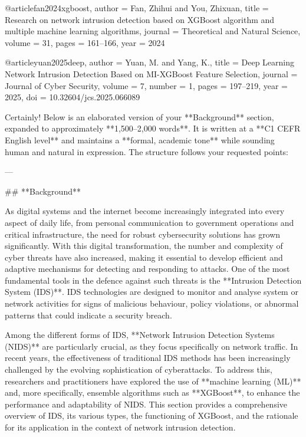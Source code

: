 @article{fan2024xgboost,
  author = {Fan, Zhihui and You, Zhixuan},
  title = {Research on network intrusion detection based on XGBoost algorithm and multiple machine learning algorithms},
  journal = {Theoretical and Natural Science},
  volume = {31},
  pages = {161–166},
  year = {2024}
}

@article{yuan2025deep,
  author = {Yuan, M. and Yang, K.},
  title = {Deep Learning Network Intrusion Detection Based on MI-XGBoost Feature Selection},
  journal = {Journal of Cyber Security},
  volume = {7},
  number = {1},
  pages = {197–219},
  year = {2025},
  doi = {10.32604/jcs.2025.066089}
}






Certainly! Below is an elaborated version of your **Background** section, expanded to approximately **1,500–2,000 words**. It is written at a **C1 CEFR English level** and maintains a **formal, academic tone** while sounding human and natural in expression. The structure follows your requested points:

---

## **Background**

As digital systems and the internet become increasingly integrated into every aspect of daily life, from personal communication to government operations and critical infrastructure, the need for robust cybersecurity solutions has grown significantly. With this digital transformation, the number and complexity of cyber threats have also increased, making it essential to develop efficient and adaptive mechanisms for detecting and responding to attacks. One of the most fundamental tools in the defence against such threats is the **Intrusion Detection System (IDS)**. IDS technologies are designed to monitor and analyse system or network activities for signs of malicious behaviour, policy violations, or abnormal patterns that could indicate a security breach.

Among the different forms of IDS, **Network Intrusion Detection Systems (NIDS)** are particularly crucial, as they focus specifically on network traffic. In recent years, the effectiveness of traditional IDS methods has been increasingly challenged by the evolving sophistication of cyberattacks. To address this, researchers and practitioners have explored the use of **machine learning (ML)** and, more specifically, ensemble algorithms such as **XGBoost**, to enhance the performance and adaptability of NIDS. This section provides a comprehensive overview of IDS, its various types, the functioning of XGBoost, and the rationale for its application in the context of network intrusion detection.

